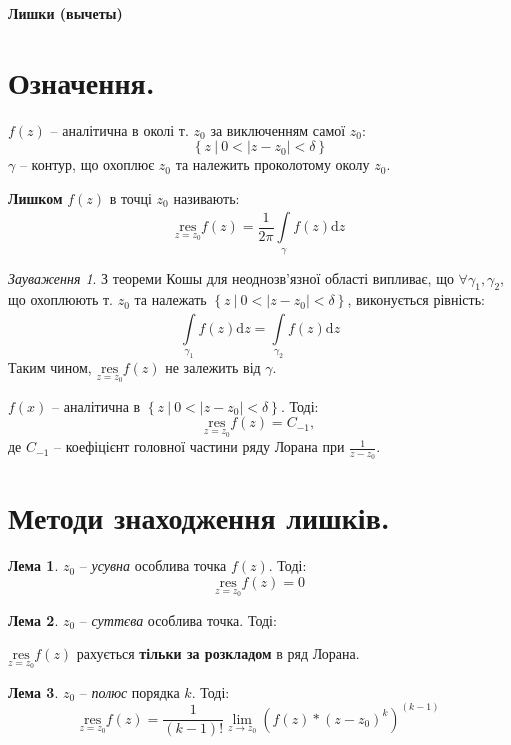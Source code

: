 \documentclass[a4paper]{scrartcl}
\theoremstyle{definition}
\newtheorem*{lemme}{Лема}
\theoremstyle{remark}
\newtheorem*{remark}{Зауваження}
\theoremstyle{definition}
\theoremstyle{definition}
\def\bdash{\ \Big|\  }         %
\def\res#1{\underset{#1}{\mathrm{res}}}
\begin{document}
\tableofcontents
\newpage

\begin{center}
	\Huge \textbf{Лишки (вычеты)}
\end{center}
\par
\section{Означення.}
 $f(z)$ -- аналітична в околі т. $z_0$ за виключенням самої $z_0 : $$$\left\lbrace z \bdash 0 < \left| z - z_0 \right| < \delta \right\rbrace$$
  $\gamma $ -- контур, що охоплює $z_0$ та належить проколотому околу $z_0$. \par
  \textbf{Лишком} $f(z)$ в точці $z_0$ називають:
  $$
  \res{z=z_0} f(z) = \frac{1}{2 \pi}   \int\limits_{\gamma}^{}{f(z)\mathrm{d} z}
  $$
\begin{remark}
  З теореми Кошы для неоднозв'язної області випливає, що $\forall \gamma_1 , \gamma_2$, що охоплюють т. $z_0$ та належать $\left\lbrace z \bdash 0 < \left| z - z_0 \right| < \delta \right\rbrace$, виконується рівність:
  $$
  \int\limits_{\gamma_1}^{}{f(z)\mathrm{d} z}=
  \int\limits_{\gamma_2}^{}{f(z)\mathrm{d} z}
  $$
  Таким чином, $\res{z=z_0} f(z)$ не залежить від $\gamma$.
\end{remark}
\begin{boxteo}
 $f(x)$ -- аналітична в $\left\lbrace z \bdash 0 < \left| z - z_0 \right| < \delta \right\rbrace$. Тоді:
 $$
 \res{z=z_0} f(z) = C_{-1},
 $$
 де $C_{-1}$ -- коефіцієнт головної частини ряду Лорана при $ \frac{1}{z - z_0} $.
\end{boxteo}

\section{Методи знаходження лишків.}
\begin{lemme}
  $z_0$ -- \textit{усувна} особлива точка $f(z)$. Тоді:
  $$
  \res{z = z_0} f(z) = 0
  $$
\end{lemme}
\begin{lemme}
  $z_0$ -- \textit{суттєва} особлива точка. Тоді:
  \begin{center}
   $\res{z = z_0} f(z)$ рахується \textbf{тільки за розкладом} в ряд Лорана.
  \end{center}
\end{lemme}

\begin{lemme}
  $z_0$ -- \textit{полюс} порядка $k$. Тоді:
$$
\res{z=  z_0} f(z) = \frac{1}{(k-1)!}  \lim\limits_{z\to z_0}{ \left( f(z) * (z-z_0)^k \right)^{(k-1)}}
$$
\end{lemme}
\end{document}
